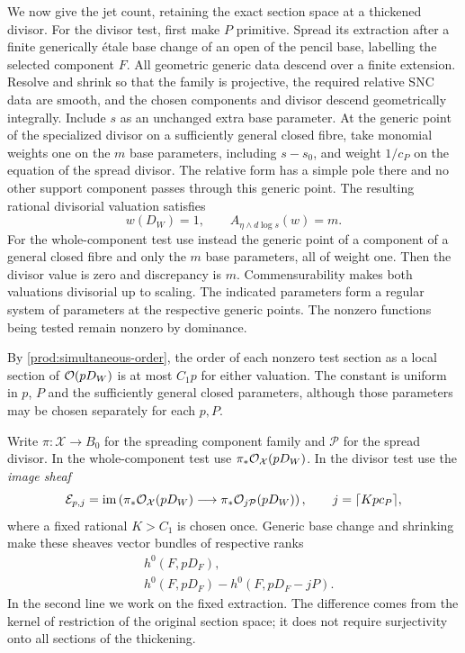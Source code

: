 We now give the jet count, retaining the exact section space at a
thickened divisor.  For the divisor test, first make $P$ primitive.
Spread its extraction after a finite generically \'etale base change
of an open of the pencil base, labelling the selected component $F$.
All geometric generic data descend over a finite extension.  Resolve
and shrink so that the family is projective, the required relative
SNC data are smooth, and the chosen components and divisor descend
geometrically integrally.  Include $s$ as an unchanged extra base
parameter.  At the generic point of the specialized divisor on a
sufficiently general closed fibre, take monomial weights one on the
$m$ base parameters, including $s-s_0$, and weight $1/c_P$ on the
equation of the spread divisor.  The relative form has a simple pole
there and no other support component passes through this generic point.
The resulting rational divisorial valuation satisfies
\begin{equation}\label{prod:jet-test-values}
 w(D_W)=1,\qquad A_{\eta\wedge d\log s}(w)=m.
\end{equation}
For the whole-component test use instead the generic point of a
component of a general closed fibre and only the $m$ base parameters,
all of weight one.  Then the divisor value is zero and discrepancy is
$m$.  Commensurability makes both valuations divisorial up to scaling.
The indicated parameters form a regular system of parameters at the
respective generic points.  The nonzero functions being tested remain
nonzero by dominance.

By \eqref{prod:simultaneous-order}, the order of each nonzero test
section as a local section of $\mathcal O(pD_W)$ is at most $C_1p$ for either
valuation.  The constant is uniform in $p$, $P$ and the sufficiently
general closed parameters, although those parameters may be chosen
separately for each $p,P$.

Write $\pi:\mathcal X\to B_0$ for the spreading component family and
$\mathcal P$ for the spread divisor.  In the whole-component test use
$\pi_*\mathcal O_{\mathcal X}(pD_W)$.  In the divisor test use the
\emph{image sheaf}
\[
 \mathcal E_{p,j}=\operatorname{im}\left(
 \pi_*\mathcal O_{\mathcal X}(pD_W)
 \longrightarrow\pi_*\mathcal O_{j\mathcal P}(pD_W)\right),
 \qquad j=\lceil Kpc_P\rceil,
\]
where a fixed rational $K>C_1$ is chosen once.
Generic base change and shrinking make these sheaves vector bundles
of respective ranks
\begin{equation}\label{prod:image-ranks}
 \begin{split}
 &h^0(F,pD_F),\\
 &h^0(F,pD_F)-h^0(F,pD_F-jP).
 \end{split}
\end{equation}
In the second line we work on the fixed extraction.  The difference
comes from the kernel of restriction of the original section space;
it does not require surjectivity onto all sections of the thickening.

